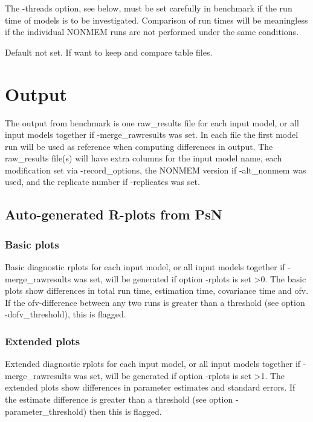 The -threads option, see below, must be set carefully in benchmark if the run time
of models is to be investigated. Comparison of run times will be meaningless
if the individual NONMEM runs are not performed under the same conditions.

\begin{optionlist}
Default not set. If want to keep and compare table files.
\end{optionlist}


\section{Output}
The output from benchmark is
one raw\_results file for each input model, or all input models together if -merge\_rawresults was set.
In each file the first model run will be used as reference when computing differences in output.
The raw\_results file(s) will have extra columns for the input model name, each
modification set via -record\_options, the NONMEM version if -alt\_nonmem was used, and the replicate
number if -replicates was set.




\subsection{Auto-generated R-plots from PsN}
\newcommand{\rplotsconditions}{The default benchmark template 
requires no special R libraries.
If no pdf is generated,
see the .Rout file in the main run directory for error messages.}


\subsubsection*{Basic plots}
Basic diagnostic rplots for each input model, or all input models together if -merge\_rawresults was set, 
will be generated if option -rplots is set >0.
The basic plots show differences in total run time, estimation time, covariance time and ofv.
If the ofv-difference between any two runs is greater than a threshold (see option -dofv\_threshold), this is flagged. 

\subsubsection*{Extended plots}
Extended diagnostic rplots for each input model, or all input models together if -merge\_rawresults was set, 
will be generated if option -rplots is set >1.
The extended plots show differences in parameter estimates and standard errors.
If the estimate difference is greater than a threshold (see option -parameter\_threshold) then this is flagged.
